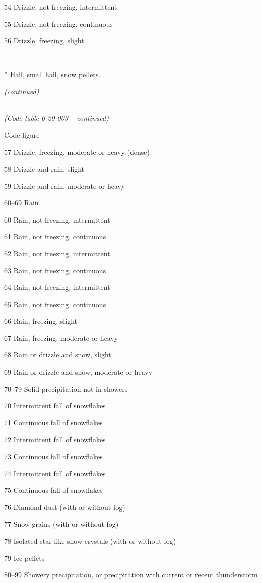 54 Drizzle, not freezing, intermittent

55 Drizzle, not freezing, continuous

56 Drizzle, freezing, slight

\_\_\_\_\_\_\_\_\_\_\_\_\_\_\_\_

* Hail, small hail, snow pellets.

\emph{(continued)}

\emph{\\
(Code table 0 20 003 -- continued)}

Code figure

57 Drizzle, freezing, moderate or heavy (dense)

58 Drizzle and rain, slight

59 Drizzle and rain, moderate or heavy

60--69 Rain

60 Rain, not freezing, intermittent

61 Rain, not freezing, continuous

62 Rain, not freezing, intermittent

63 Rain, not freezing, continuous

64 Rain, not freezing, intermittent

65 Rain, not freezing, continuous

66 Rain, freezing, slight

67 Rain, freezing, moderate or heavy

68 Rain or drizzle and snow, slight

69 Rain or drizzle and snow, moderate or heavy

70--79 Solid precipitation not in showers

70 Intermittent fall of snowflakes

71 Continuous fall of snowflakes

72 Intermittent fall of snowflakes

73 Continuous fall of snowflakes

74 Intermittent fall of snowflakes

75 Continuous fall of snowflakes

76 Diamond dust (with or without fog)

77 Snow grains (with or without fog)

78 Isolated star-like snow crystals (with or without fog)

79 Ice pellets

80--99 Showery precipitation, or precipitation with current or recent thunderstorm

